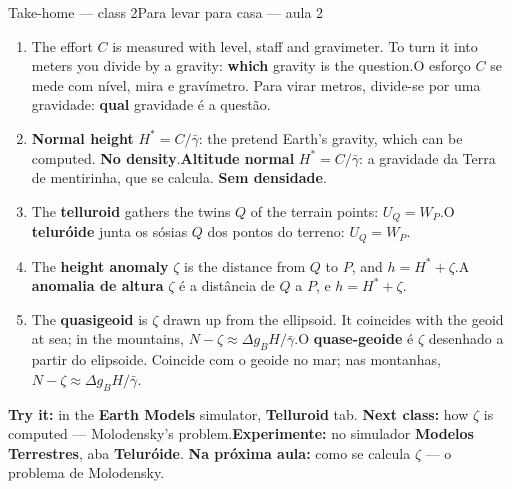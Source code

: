 \documentclass[aspectratio=169,11pt]{beamer}
\newcommand{\tr}[2]{\ifEN#2\else#1\fi}
\newcommand{\bnum}[1]{\textbf{\textcolor{mTeal}{#1}}}
\begin{document}
\begin{frame}{\tr{Para levar para casa --- aula 2}{Take-home --- class 2}}
  \small
  \begin{enumerate}
    \setlength{\itemsep}{2pt}
    \item \tr{O esforço $C$ se mede com nível, mira e gravímetro. Para virar metros, divide-se
          por uma gravidade: \bnum{qual} gravidade é a questão.}{The effort $C$ is measured
          with level, staff and gravimeter. To turn it into meters you divide by a gravity:
          \bnum{which} gravity is the question.}
    \item \tr{\textcolor{corIdeal}{\textbf{Altitude normal}} $H^{*} = C/\bar\gamma$: a gravidade
          da Terra de mentirinha, que se calcula. \bnum{Sem densidade}.}{\textcolor{corIdeal}
          {\textbf{Normal height}} $H^{*} = C/\bar\gamma$: the pretend Earth's gravity, which
          can be computed. \bnum{No density}.}
    \item \tr{O \textcolor{corIdeal}{\textbf{teluróide}} junta os sósias $Q$ dos pontos do
          terreno: $U_Q = W_P$.}{The \textcolor{corIdeal}{\textbf{telluroid}} gathers the twins
          $Q$ of the terrain points: $U_Q = W_P$.}
    \item \tr{A \textcolor{corQuase}{\textbf{anomalia de altura}} $\zeta$ é a distância de $Q$ a
          $P$, e $h = H^{*} + \zeta$.}{The \textcolor{corQuase}{\textbf{height anomaly}}
          $\zeta$ is the distance from $Q$ to $P$, and $h = H^{*} + \zeta$.}
    \item \tr{O \textcolor{corQuase}{\textbf{quase-geoide}} é $\zeta$ desenhado a partir do
          elipsoide. Coincide com o geoide no mar; nas montanhas, $N - \zeta \approx \Delta g_B
          H / \bar\gamma$.}{The \textcolor{corQuase}{\textbf{quasigeoid}} is $\zeta$ drawn up
          from the ellipsoid. It coincides with the geoid at sea; in the mountains, $N - \zeta
          \approx \Delta g_B H / \bar\gamma$.}
  \end{enumerate}
  \begin{ideia}
    \scriptsize \tr{\textbf{Experimente:} no simulador \textbf{Modelos Terrestres}, aba
    \textbf{Teluróide}. \textbf{Na próxima aula:} como se calcula $\zeta$ --- o problema de
    Molodensky.}{\textbf{Try it:} in the \textbf{Earth Models} simulator, \textbf{Telluroid}
    tab. \textbf{Next class:} how $\zeta$ is computed --- Molodensky's problem.}
  \end{ideia}
\end{frame}
\end{document}

